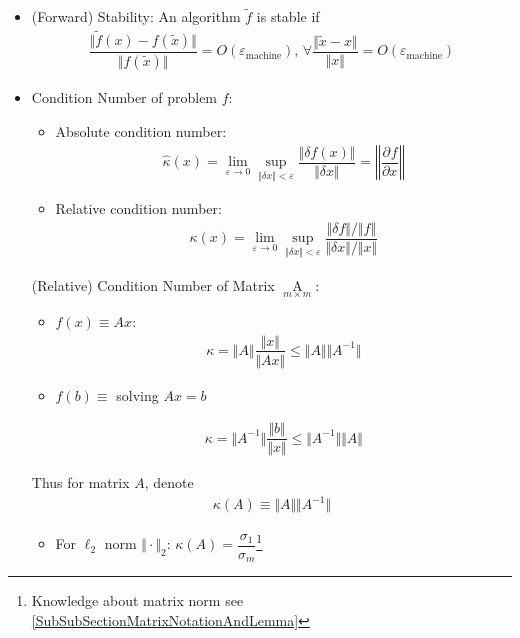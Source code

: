 \begin{itemize}[topsep=2pt,itemsep=0pt]
\begin{itemize}[topsep=2pt,itemsep=0pt]
\end{itemize}
    \item (Forward) Stability: An algorithm $ \tilde{f} $ is stable if 
    \begin{align}
        \dfrac{\Vert \tilde{f}(x)-f(\tilde{x})\Vert }{\Vert f(\tilde{x})\Vert }=O(\varepsilon _\mathrm{machine} ),\,\forall \dfrac{\Vert \tilde{x}-x\Vert }{\Vert x\Vert }=O(\varepsilon _\mathrm{machine} ) 
    \end{align}
    \item Condition Number of problem $ f $:
    \begin{itemize}[topsep=2pt,itemsep=0pt]
        \item Absolute condition number:
        \begin{align}
            \hat{\kappa }(x)=\lim_{\varepsilon \to 0}\mathop{\sup}\limits_{\Vert \delta x\Vert <\varepsilon }\dfrac{\Vert\delta f(x)\Vert}{\Vert\delta x\Vert}=\left\Vert \dfrac{\partial^{} f}{\partial x^{}}\right\Vert   
        \end{align}
        \item Relative condition number:
        \begin{align}
            \kappa (x)=\lim_{\varepsilon \to 0} \mathop{\sup}\limits_{\Vert \delta x\Vert <\varepsilon }\dfrac{\Vert \delta f\Vert \big/\Vert f\Vert }{\Vert \delta x\Vert \big/\Vert x\Vert }
        \end{align}
    \end{itemize}

    (Relative) Condition Number of Matrix $ \mathop{A}\limits_{m\times m}  $: 
    \begin{itemize}[topsep=2pt,itemsep=0pt]
        \item $ f(x)\equiv Ax $:
        \begin{align}
            \kappa =\Vert A\Vert \dfrac{ \Vert x\Vert }{\Vert Ax\Vert }\leq \Vert A\Vert \Vert A^{-1}\Vert  
        \end{align}
        \item $ f(b)\equiv  $ solving $ Ax=b $
        
        \begin{align}
            \kappa = \Vert A^{-1}\Vert \dfrac{\Vert b\Vert }{\Vert x\Vert }\leq \Vert A^{-1}\Vert \Vert A\Vert 
        \end{align}
    \end{itemize}
    
        Thus for matrix $ A $, denote 
        \begin{align}
            \kappa  (A)\equiv \Vert A\Vert\Vert A^{-1}\Vert 
        \end{align}
        
    \begin{itemize}[topsep=2pt,itemsep=0pt]
        \item For $ \ell_2 $ norm $ \Vert\cdot\Vert_2 $: $ \kappa (A)=\dfrac{\sigma  _1}{\sigma  _m} $\footnote{Knowledge about matrix norm see \autoref{SubSubSectionMatrixNotationAndLemma}}
    \end{itemize}
\end{itemize}
